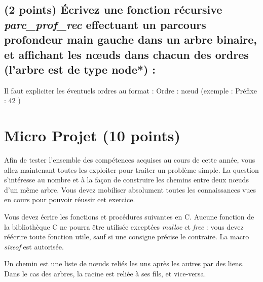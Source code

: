 \documentclass[11pt,a4paper]{article}
\begin{document}
\subsection{(2 points) \'Ecrivez une fonction récursive \og \textit{parc\_prof\_rec} \fg{} effectuant un parcours profondeur main gauche dans un arbre binaire, et affichant les nœuds dans chacun des ordres (l'arbre est de type node*) : }

\noindent Il faut expliciter les éventuels ordres au format : \og Ordre : nœud \fg{} (exemple : \og Préfixe : 42 \fg{})

\begin{center}
\end{center}





\clearpage



\section{Micro Projet (10 points)}

\noindent Afin de tester l'ensemble des compétences acquises au cours de cette année, vous allez maintenant toutes les exploiter pour traiter un problème simple.
La question s'intéresse au nombre et à la façon de construire les chemins entre deux nœuds d'un même arbre.
Vous devez mobiliser absolument toutes les connaissances vues en cours pour pouvoir réussir cet exercice.

\noindent Vous devez écrire les fonctions et procédures suivantes en C.
Aucune fonction de la bibliothèque C ne pourra être utilisée exceptées \textit{malloc} et \textit{free} : vous devez réécrire toute fonction utile, sauf si une consigne précise le contraire.
La macro \textit{sizeof} est autorisée.

\medskip

\noindent Un chemin est une liste de nœuds reliés les uns après les autres par des liens.
Dans le cas des arbres, la racine est reliée à ses fils, et vice-versa.

\smallskip
\end{document}
